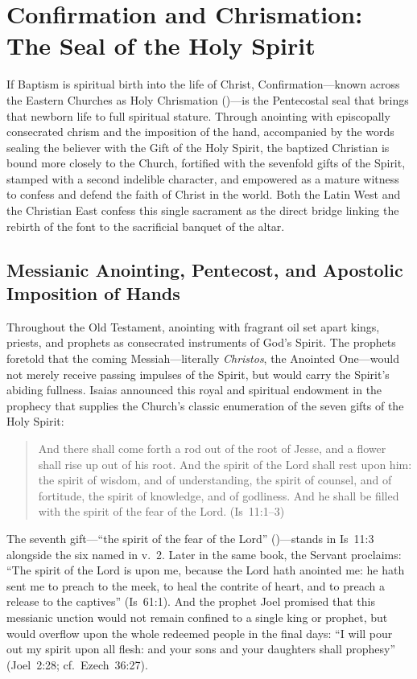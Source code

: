 \section{Confirmation and Chrismation: The Seal of the Holy Spirit}
\label{sec:confirmation}

If Baptism is spiritual birth into the life of Christ, Confirmation---known across the Eastern Churches as Holy Chrismation ()---is the Pentecostal seal that brings that newborn life to full spiritual stature. Through anointing with episcopally consecrated chrism and the imposition of the hand, accompanied by the words sealing the believer with the Gift of the Holy Spirit, the baptized Christian is bound more closely to the Church, fortified with the sevenfold gifts of the Spirit, stamped with a second indelible character, and empowered as a mature witness to confess and defend the faith of Christ in the world. Both the Latin West and the Christian East confess this single sacrament as the direct bridge linking the rebirth of the font to the sacrificial banquet of the altar.

\subsection{Messianic Anointing, Pentecost, and Apostolic Imposition of Hands}
\label{subsec:confirmation-scripture}

Throughout the Old Testament, anointing with fragrant oil set apart kings, priests, and prophets as consecrated instruments of God's Spirit. The prophets foretold that the coming Messiah---literally \emph{Christos}, the Anointed One---would not merely receive passing impulses of the Spirit, but would carry the Spirit's abiding fullness. Isaias announced this royal and spiritual endowment in the prophecy that supplies the Church's classic enumeration of the seven gifts of the Holy Spirit:
\begin{quotation}
And there shall come forth a rod out of the root of Jesse, and a flower shall rise up out of his root. And the spirit of the Lord shall rest upon him: the spirit of wisdom, and of understanding, the spirit of counsel, and of fortitude, the spirit of knowledge, and of godliness. And he shall be filled with the spirit of the fear of the Lord. (Is~11:1--3)
\end{quotation}
The seventh gift---``the spirit of the fear of the Lord'' ()---stands in Is~11:3 alongside the six named in v.~2. Later in the same book, the Servant proclaims: ``The spirit of the Lord is upon me, because the Lord hath anointed me: he hath sent me to preach to the meek, to heal the contrite of heart, and to preach a release to the captives'' (Is~61:1). And the prophet Joel promised that this messianic unction would not remain confined to a single king or prophet, but would overflow upon the whole redeemed people in the final days: ``I will pour out my spirit upon all flesh: and your sons and your daughters shall prophesy'' (Joel~2:28; cf.~Ezech~36:27).

